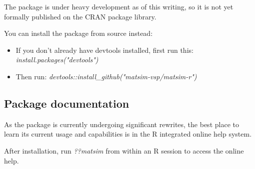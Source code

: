 The package is under heavy development as of this writing, so it is not yet formally published on the CRAN package library.

You can install the package from source instead:

\begin{itemize}
  \tightlist
    \item
      If you don’t already have devtools installed, first run this:
      \emph{install.packages("devtools")}
    \item
      Then run: \emph{devtools::install\_github("matsim-vsp/matsim-r")}

\end{itemize}

\subsection{Package documentation}

As the package is currently undergoing significant rewrites, the best place to learn its current usage and capabilities is in the R integrated online help system.

After installation, run \emph{??matsim} from within an R session to access the online help.

